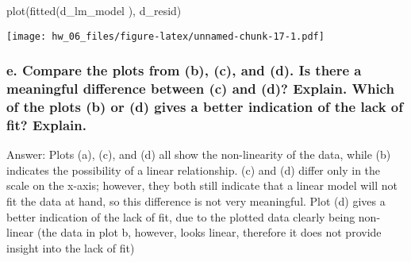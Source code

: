 \documentclass[
]{article}
\newenvironment{Shaded}{\begin{snugshade}}{\end{snugshade}}
\newcommand{\FunctionTok}[1]{\textcolor[rgb]{0.00,0.00,0.00}{#1}}
\newcommand{\NormalTok}[1]{#1}
\begin{document}
\begin{Shaded}
\begin{Highlighting}[]
\FunctionTok{plot}\NormalTok{(}\FunctionTok{fitted}\NormalTok{(d\_lm\_model ), d\_resid)}
\end{Highlighting}
\end{Shaded}

\texttt{[image: hw\_06\_files/figure-latex/unnamed-chunk-17-1.pdf]}

\hypertarget{e.-compare-the-plots-from-b-c-and-d.-is-there-a-meaningful-difference-between-c-and-d-explain.-which-of-the-plots-b-or-d-gives-a-better-indication-of-the-lack-of-fit-explain.}{%
\subsubsection{e. Compare the plots from (b), (c), and (d). Is there a
meaningful difference between (c) and (d)? Explain. Which of the plots
(b) or (d) gives a better indication of the lack of fit?
Explain.}\label{e.-compare-the-plots-from-b-c-and-d.-is-there-a-meaningful-difference-between-c-and-d-explain.-which-of-the-plots-b-or-d-gives-a-better-indication-of-the-lack-of-fit-explain.}}

Answer: Plots (a), (c), and (d) all show the non-linearity of the data,
while (b) indicates the possibility of a linear relationship. (c) and
(d) differ only in the scale on the x-axis; however, they both still
indicate that a linear model will not fit the data at hand, so this
difference is not very meaningful. Plot (d) gives a better indication of
the lack of fit, due to the plotted data clearly being non-linear (the
data in plot b, however, looks linear, therefore it does not provide
insight into the lack of fit)
\end{document}
